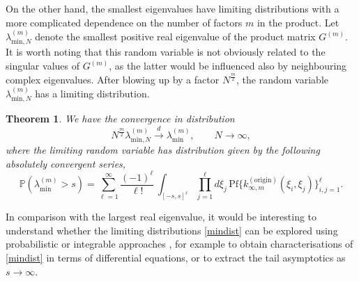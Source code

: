 \documentclass[11pt,reqno]{amsproc}
\newtheorem{theorem}{Theorem}
\numberwithin{equation}{section}
\numberwithin{theorem}{section}
\begin{document}
On the other hand, the smallest eigenvalues have limiting distributions with a more complicated dependence on the number of factors $m$ in the product. Let $\lambda^{(m)}_{\mathrm{min},N}$ denote the smallest positive real eigenvalue of the product matrix $G^{(m)}$. It is worth noting that this random variable is not obviously related to the singular values of $G^{(m)}$, as the latter would be influenced also by neighbouring complex eigenvalues. After blowing up by a factor $N^{\frac{m}{2}}$, the random variable $\lambda^{(m)}_{\mathrm{min},N}$ has a limiting distribution.
\begin{theorem}
\label{th:smalleigintro}
We have the convergence in distribution
\begin{equation}
N^{\frac{m}{2}}\lambda^{(m)}_{\mathrm{min},N} \overset{d}{\longrightarrow} \lambda^{(m)}_{\mathrm{min}}, \qquad N \to \infty,
\end{equation}
where the limiting random variable has distribution given by the following absolutely convergent series,
\begin{equation}
\mathbb{P}(\lambda^{(m)}_{\mathrm{min}} > s) = \sum_{\ell=1}^{\infty}\frac{(-1)^{\ell}}{\ell!}\,\int_{[-s,s]^{\ell}}\prod_{j=1}^{\ell}d\xi_{j}\,\mathrm{Pf}\bigg\{k^{(\mathrm{origin})}_{\infty,m}(\xi_{i},\xi_{j})\bigg\}_{i,j=1}^{\ell}. \label{mindist}
\end{equation}
\end{theorem}
In comparison with the largest real eigenvalue, it would be interesting to understand whether the limiting distributions \eqref{mindist} can be explored using probabilistic \cite{FTZ20,FTZ21} or integrable approaches \cite{BB20}, for example to obtain characterisations of \eqref{mindist} in terms of differential equations, or to extract the tail asymptotics as $s \to \infty$. 
\end{document}
